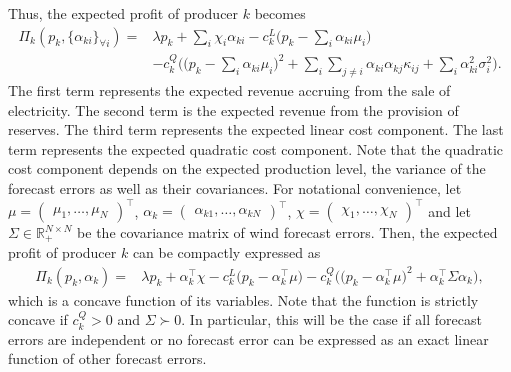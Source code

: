 \documentclass{article}
\begin{document}
Thus, the expected profit of producer $k$ becomes
\begin{align*}
\Pi_k(p_k, \{\alpha_{ki}\}_{\forall i}) =& \lambda p_k + \sum_i \chi_i \alpha_{ki} - c_k^L\Big(p_k - \sum_i \alpha_{ki} \mu_i\Big)\\
&- c_k^Q \Big(\big(p_k - \sum_i \alpha_{ki} \mu_i\big)^2 + \sum_i \sum_{j \ne i} \alpha_{ki} \alpha_{kj}  \kappa_{ij} + \sum_i \alpha_{ki}^2 \sigma_i^2\Big).
\end{align*}
The first term represents the expected revenue accruing from the sale of electricity. The second term is the expected revenue from the provision of reserves. The third term represents the expected linear cost component. The last term represents the expected quadratic cost component. Note that the quadratic cost component depends on the expected production level, the variance of the forecast errors as well as their covariances. For notational convenience, let $\mu = \begin{pmatrix} \mu_1, \ldots, \mu_N \end{pmatrix}^\top$, $\alpha_k = \begin{pmatrix} \alpha_{k1}, \ldots, \alpha_{kN} \end{pmatrix}^\top$, $\chi = \begin{pmatrix} \chi_1, \ldots, \chi_N \end{pmatrix}^\top$ and let $\Sigma \in \mathbb{R}_+^{N \times N}$ be the covariance matrix of wind forecast errors. Then, the expected profit of producer $k$ can be compactly expressed as
\begin{align*}
\Pi_k(p_k, \alpha_k) =& \lambda p_k + \alpha_k^\top \chi - c_k^L\big(p_k - \alpha_k^\top \mu\big) - c_k^Q \Big(\big(p_k - \alpha_{k}^\top \mu \big)^2 + \alpha_k^\top \Sigma \alpha_k\Big),
\end{align*}
which is a concave function of its variables. Note that the function is strictly concave if $c_k^Q > 0$ and $\Sigma \succ 0$. In particular, this will be the case if all forecast errors are independent or no forecast error can be expressed as an exact linear function of other forecast errors.
\end{document}
